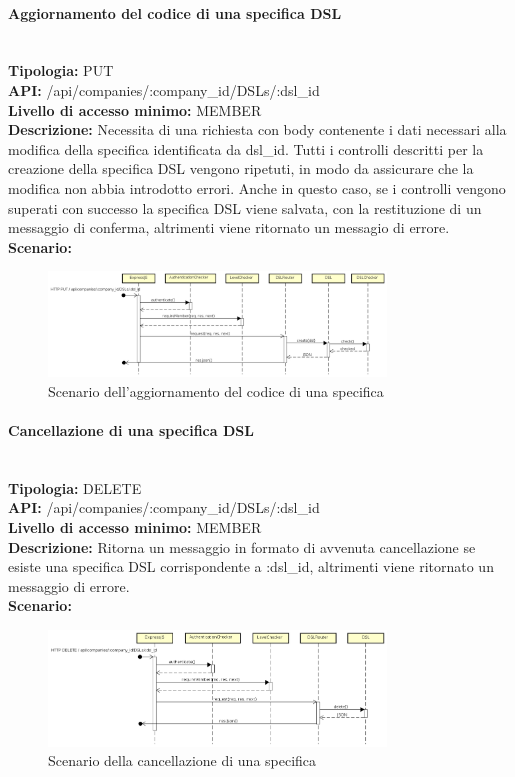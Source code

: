 \paragraph{Aggiornamento del codice di una specifica DSL}\mbox{}\\
\textbf{Tipologia:} PUT \\
\textbf{API:} /api/companies/:company\_id/DSLs/:dsl\_id \\
\textbf{Livello di accesso minimo:} MEMBER \\
\textbf{Descrizione:} Necessita di una richiesta con body contenente i dati necessari alla modifica della specifica  identificata da dsl\_id. Tutti i controlli descritti per la creazione della specifica DSL vengono ripetuti, in modo da assicurare che la modifica non abbia introdotto errori. Anche in questo caso, se i controlli vengono superati con successo la specifica DSL viene salvata, con la restituzione di un messaggio di conferma, altrimenti viene ritornato un messagio di errore. \\
\textbf{Scenario:}
\begin{figure}[H]
\centering
\includegraphics[width=0.8\textwidth]{res/sections/backend/sequence/(PUT)dsl.png}
\caption{Scenario dell'aggiornamento del codice di una specifica }
\end{figure}

\newpage
\paragraph{Cancellazione di una specifica DSL}\mbox{}\\
\textbf{Tipologia:} DELETE \\
\textbf{API:} /api/companies/:company\_id/DSLs/:dsl\_id \\
\textbf{Livello di accesso minimo:} MEMBER \\
\textbf{Descrizione:} Ritorna un messaggio in formato  di avvenuta cancellazione se esiste una specifica DSL corrispondente a :dsl\_id, altrimenti viene ritornato un messaggio di errore. \\
\textbf{Scenario:} 
\begin{figure}[H]
\centering
\includegraphics[width=0.8\textwidth]{res/sections/backend/sequence/(DELETE)dsl.png}
\caption{Scenario della cancellazione di una specifica }
\end{figure}

